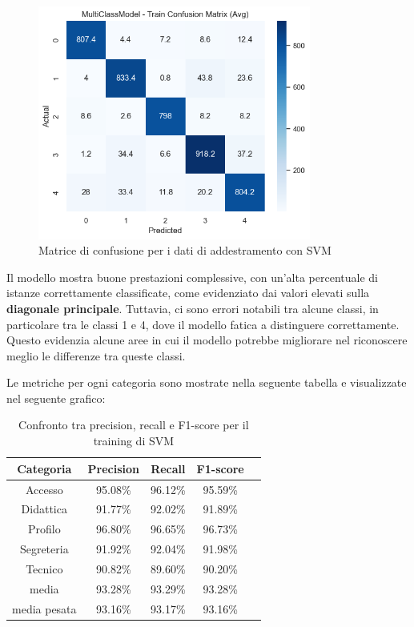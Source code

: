 \begin{figure}[H]
    \centering
    \includegraphics[width=0.8\textwidth]{images/confusion_matrix_train_svm.png}
    \caption{Matrice di confusione per i dati di addestramento con SVM}
    \label{fig:confusion_matrix_train_svm}
\end{figure}

Il modello mostra buone prestazioni complessive, con un’alta percentuale di istanze correttamente classificate, come evidenziato dai valori elevati sulla \textbf{diagonale principale}. Tuttavia, ci sono errori notabili tra alcune classi, in particolare tra le classi 1 e 4, dove il modello fatica a distinguere correttamente. Questo evidenzia alcune aree in cui il modello potrebbe migliorare nel riconoscere meglio le differenze tra queste classi.

\newpage

Le metriche per ogni categoria sono mostrate nella seguente tabella e visualizzate nel seguente grafico:

\begin{table}[H]
    \centering
    \begin{tabular}{|c|c|c|c|c|}
        \hline
        \textbf{Categoria} & \textbf{Precision} & \textbf{Recall} & \textbf{F1-score} \\
        \hline
        Accesso & 95.08\% & 96.12\% & 95.59\% \\
        \hline
        Didattica & 91.77\% & 92.02\% & 91.89\% \\
        \hline
        Profilo & 96.80\% & 96.65\% & 96.73\% \\
        \hline
        Segreteria & 91.92\% & 92.04\% & 91.98\% \\
        \hline
        Tecnico & 90.82\% & 89.60\% & 90.20\% \\
        \hline
        media & 93.28\% & 93.29\% & 93.28\% \\
        \hline
        media pesata & 93.16\% & 93.17\% & 93.16\% \\
        \hline
    \end{tabular}
    \caption{Confronto tra precision, recall e F1-score per il training di SVM}
    \label{tab:metriche_svm_train}
\end{table}

